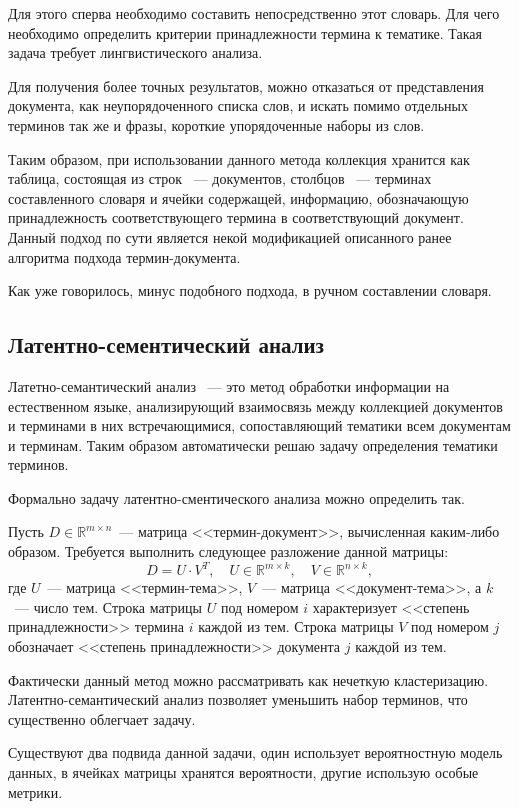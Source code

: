 \documentclass[annotation,times,page4]{itmo-student-thesis}
\begin{document}
Для этого сперва необходимо составить непосредственно этот словарь. Для чего необходимо определить критерии принадлежности термина к тематике. Такая задача требует лингвистического анализа.

Для получения более точных результатов, можно отказаться от представления документа, как неупорядоченного списка слов, и искать помимо отдельных терминов так же и фразы, короткие упорядоченные наборы из слов.

Таким образом, при использовании данного метода коллекция хранится как таблица, состоящая из строк ~--- документов, столбцов ~--- терминах составленного словаря и ячейки содержащей, информацию, обозначающую принадлежность соответствующего термина в соответствующий документ. Данный подход по сути является некой модификацией описанного ранее алгоритма подхода термин-документа.

Как уже говорилось, минус подобного подхода, в ручном составлении словаря.
\subsection{Латентно-сементический анализ}
Латетно-семантический анализ ~--- это метод обработки информации на естественном языке, анализирующий взаимосвязь между коллекцией документов и терминами в них встречающимися, сопоставляющий тематики всем документам и терминам. Таким образом автоматически решаю задачу определения тематики терминов.

Формально задачу латентно-сментического анализа можно определить так.

Пусть $D \in \mathbb{R}^{m \times n}$~--- матрица 
<<термин-документ>>, вычисленная каким-либо образом. Требуется
выполнить следующее разложение данной матрицы:
\[
    D = U \cdot V^T,\quad U \in \mathbb{R}^{m \times k},\quad V \in \mathbb{R}^{n \times k},
\]
где $U$~--- матрица <<термин-тема>>, $V$~--- матрица <<документ-тема>>,
а $k$~--- число тем. Строка матрицы $U$ под номером $i$ 
характеризует <<степень принадлежности>> термина $i$ 
каждой из тем. Строка матрицы $V$ под номером $j$ обозначает
<<степень принадлежности>> документа $j$ каждой из тем.

Фактически данный метод можно рассматривать как нечеткую кластеризацию. Латентно-семантический анализ позволяет уменьшить набор терминов, что существенно облегчает задачу.

Существуют два подвида данной задачи, один использует вероятностную модель данных, в ячейках матрицы хранятся вероятности, другие использую особые метрики.
\end{document}
